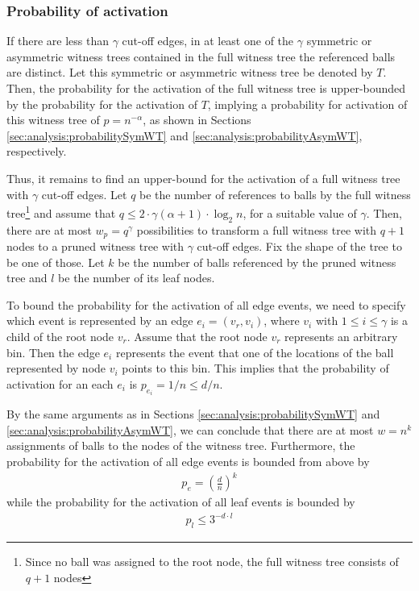 \documentclass[a4paper,12pt]{article}
\begin{document}
\subsubsection{Probability of activation}
\label{sec:analysis:probabilityFullWT}
If there are less than $\gamma$ cut-off edges, in at least one of the $\gamma$ symmetric or asymmetric witness trees contained in the full witness tree the referenced balls are distinct. Let this symmetric or asymmetric witness tree be denoted by $T$. Then, the probability for the activation of the full witness tree is upper-bounded by the probability for the activation of $T$, implying a probability for activation of this witness tree of $p = n^{- \alpha}$, as shown in Sections \ref{sec:analysis:probabilitySymWT} and \ref{sec:analysis:probabilityAsymWT}, respectively.

Thus, it remains to find an upper-bound for the activation of a full witness tree with $\gamma$ cut-off edges. Let $q$ be the number of references to balls by the full witness tree\footnote{Since no ball was assigned to the root node, the full witness tree consists of $q+1$ nodes} and assume that $q  \leq 2\cdot \gamma\left(\alpha+1\right)\cdot \log_2 n$, for a suitable value of $\gamma$. Then, there are at most $w_p=q^\gamma$ possibilities to transform a full witness tree with $q+1$ nodes to a pruned witness tree with $\gamma$ cut-off edges. Fix the shape of the tree to be one of those. Let $k$ be the number of balls referenced by the pruned witness tree and $l$ be the number of its leaf nodes. 

To bound the probability for the activation of all edge events, we need to specify which event is represented by an edge $e_i = (v_r, v_i)$, where $v_i$ with $1 \leq i \leq \gamma$ is a child of the root node $v_r$. Assume that the root node $v_r$ represents an arbitrary bin. Then the edge $e_i$ represents the event that one of the locations of the ball represented by node $v_i$ points to this bin. This implies that the probability of activation for an each $e_i$ is $p_{e_i} = 1/n \leq d/n$. 

By the same arguments as in Sections \ref{sec:analysis:probabilitySymWT} and \ref{sec:analysis:probabilityAsymWT}, we can conclude that there are at most $w=n^k$ assignments of balls to the nodes of the witness tree. Furthermore, the probability for the activation of all edge events is bounded from above by 
\begin{align}
p_e = \left(\frac{d}{n}\right)^{k}
\end{align}
while the probability for the activation of all leaf events is bounded by 
\begin{align}
p_l \leq 3^{-d\cdot l}
\end{align} 
\end{document}

